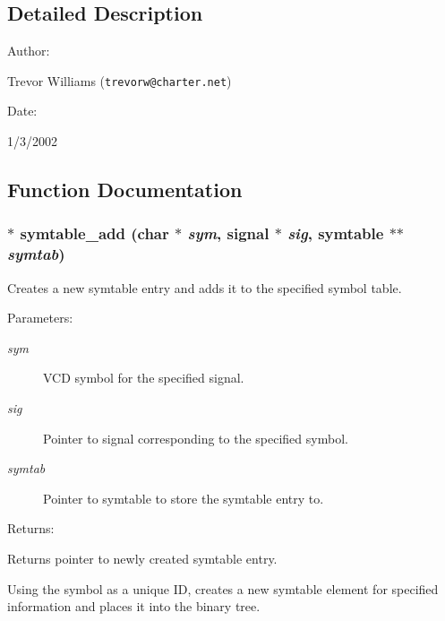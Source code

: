 \subsection{Detailed Description}


\begin{Desc}
\item[Author: ]\par
Trevor Williams ({\tt trevorw@charter.net}) \end{Desc}
\begin{Desc}
\item[Date: ]\par
1/3/2002\end{Desc}


\subsection{Function Documentation}
\subsubsection{$\ast$ symtable\_\-add (char $\ast$ {\em sym}, {\bf signal} $\ast$ {\em sig}, {\bf symtable} $\ast$$\ast$ {\em symtab})}\label{symtable_8c_a0}


Creates a new symtable entry and adds it to the specified symbol table.

\begin{Desc}
\item[Parameters: ]\par
\begin{description}
\item[{\em 
sym}]VCD symbol for the specified signal. \item[{\em 
sig}]Pointer to signal corresponding to the specified symbol. \item[{\em 
symtab}]Pointer to symtable to store the symtable entry to.\end{description}
\end{Desc}
\begin{Desc}
\item[Returns: ]\par
Returns pointer to newly created symtable entry.\end{Desc}
Using the symbol as a unique ID, creates a new symtable element for specified information and places it into the binary tree. 

